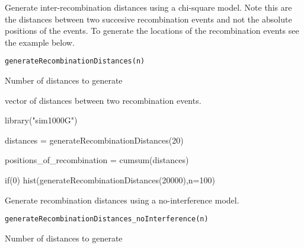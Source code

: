 \documentclass[letterpaper]{book}
\begin{document}
%
\begin{Description}\relax
Generate inter-recombination distances using a chi-square model. Note this are the distances between two succesive recombination events and not
the absolute positions of the events. To generate the locations of the recombination events see the example below.
\end{Description}
%
\begin{Usage}
\begin{verbatim}
generateRecombinationDistances(n)
\end{verbatim}
\end{Usage}
%
\begin{Arguments}
\begin{ldescription}
\item[\code{n}] Number of distances to generate
\end{ldescription}
\end{Arguments}
%
\begin{Value}
vector of distances between two recombination events.
\end{Value}
%
\begin{Examples}
\begin{ExampleCode}

library("sim1000G")

distances = generateRecombinationDistances(20)


positions_of_recombination = cumsum(distances)

if(0) hist(generateRecombinationDistances(20000),n=100)

\end{ExampleCode}
\end{Examples}
%
\begin{Description}\relax
Generate recombination distances using a no-interference model.
\end{Description}
%
\begin{Usage}
\begin{verbatim}
generateRecombinationDistances_noInterference(n)
\end{verbatim}
\end{Usage}
%
\begin{Arguments}
\begin{ldescription}
\item[\code{n}] Number of distances to generate
\end{ldescription}
\end{Arguments}
\end{document}

